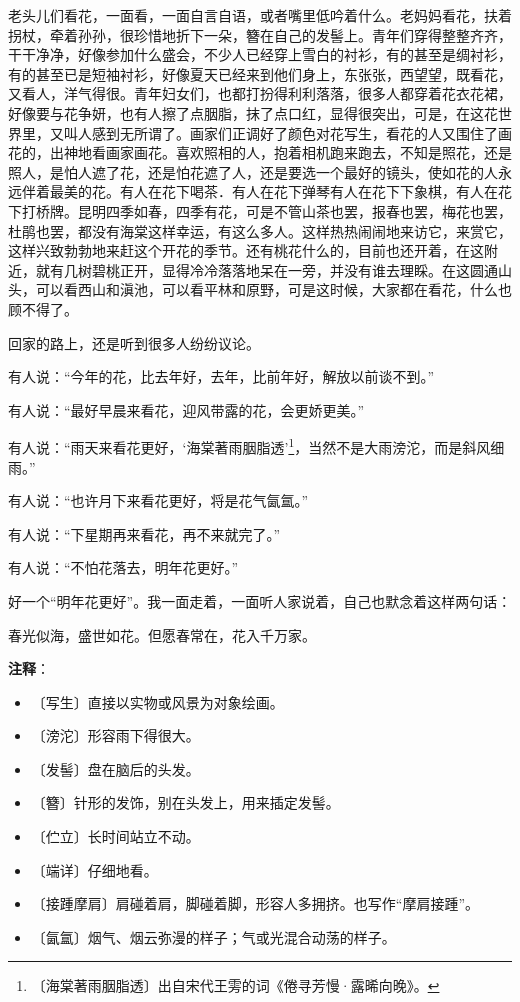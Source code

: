\documentclass[12pt,UTF-8,openany]{ctexbook}
\begin{document}
\begin{large}
    老头儿们看花，一面看，一面自言自语，或者嘴里低吟着什么。老妈妈看花，扶着拐杖，牵着孙孙，很珍惜地折下一朵，簪在自己的发髻上。青年们穿得整整齐齐，干干净净，好像参加什么盛会，不少人已经穿上雪白的衬衫，有的甚至是绸衬衫，有的甚至已是短袖衬衫，好像夏天已经来到他们身上，东张张，西望望，既看花，又看人，洋气得很。青年妇女们，也都打扮得利利落落，很多人都穿着花衣花裙，好像要与花争妍，也有人擦了点胭脂，抹了点口红，显得很突出，可是，在这花世界里，又叫人感到无所谓了。画家们正调好了颜色对花写生，看花的人又围住了画花的，出神地看画家画花。喜欢照相的人，抱着相机跑来跑去，不知是照花，还是照人，是怕人遮了花，还是怕花遮了人，还是要选一个最好的镜头，使如花的人永远伴着最美的花。有人在花下喝茶．有人在花下弹琴有人在花下下象棋，有人在花下打桥牌。昆明四季如春，四季有花，可是不管山茶也罢，报春也罢，梅花也罢，杜鹃也罢，都没有海棠这样幸运，有这么多人。这样热热闹闹地来访它，来赏它，这样兴致勃勃地来赶这个开花的季节。还有桃花什么的，目前也还开着，在这附近，就有几树碧桃正开，显得冷冷落落地呆在一旁，并没有谁去理睬。在这圆通山头，可以看西山和滇池，可以看平林和原野，可是这时候，大家都在看花，什么也顾不得了。
    
    回家的路上，还是听到很多人纷纷议论。
    
    有人说：“今年的花，比去年好，去年，比前年好，解放以前谈不到。”
    
    有人说：“最好早晨来看花，迎风带露的花，会更娇更美。”
    
    有人说：“雨天来看花更好，‘海棠著雨胭脂透’\footnote{〔海棠著雨胭脂透〕出自宋代王雱的词《倦寻芳慢·露晞向晚》。}，当然不是大雨滂沱，而是斜风细雨。”
    
    有人说：“也许月下来看花更好，将是花气氤氲。”
    
    有人说：“下星期再来看花，再不来就完了。”
    
    有人说：“不怕花落去，明年花更好。”
    
    好一个“明年花更好”。我一面走着，一面听人家说着，自己也默念着这样两句话：
    
    春光似海，盛世如花。但愿春常在，花入千万家。
    
\end{large}


\newpage

\textbf{注释}：

\vspace{-1em}

\begin{itemize}
    \setlength\itemsep{-0.2em}
    \item 〔写生〕直接以实物或风景为对象绘画。
    \item 〔滂沱〕形容雨下得很大。
    \item 〔发髻〕盘在脑后的头发。
    \item 〔簪〕针形的发饰，别在头发上，用来插定发髻。
    \item 〔伫立〕长时间站立不动。
    \item 〔端详〕仔细地看。
    \item 〔接踵摩肩〕肩碰着肩，脚碰着脚，形容人多拥挤。也写作“摩肩接踵”。
    \item 〔氤氲〕烟气、烟云弥漫的样子；气或光混合动荡的样子。
\end{itemize}
\end{document}
